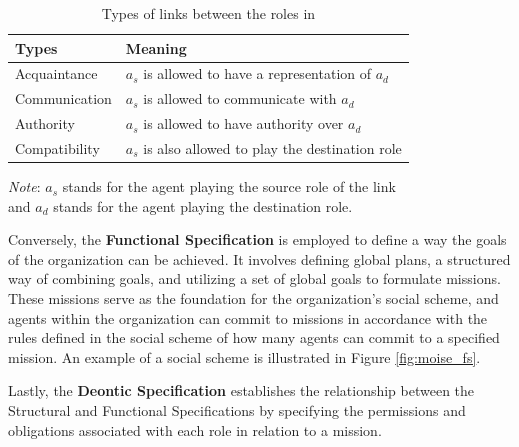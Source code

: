 \def \sourceagent{$a_s$ }
\def \destagent{$a_d$ }

\begin{table}[!htbp]
    \begin{minipage}{\columnwidth}
        \centering
        \begin{tabular}{l l}
            \toprule
            Types         & Meaning                                                        \\
            \midrule
            Acquaintance  & \sourceagent is allowed to have a representation of \destagent \\
            Communication & \sourceagent is allowed to communicate with \destagent         \\
            Authority     & \sourceagent is allowed to have authority over \destagent      \\
            Compatibility & \sourceagent is also allowed to play the destination role      \\
            \bottomrule
        \end{tabular}
        \begin{center}
            \footnotesize
            \emph{Note}: \sourceagent stands for the agent playing the source role of the link \\
            and \destagent stands for the agent playing the destination role. \\
        \end{center}
    \end{minipage}
    \caption{Types of links between the roles in \MOISEp}
    \label{tab:types_of_links_in_moise}
\end{table}

Conversely, the \textbf{Functional Specification} is employed to define a way the goals of the organization can be achieved. It involves defining global plans, a structured way of combining goals, and utilizing a set of global goals to formulate missions. These missions serve as the foundation for the organization's social scheme, and agents within the organization can commit to missions in accordance with the rules defined in the social scheme of how many agents can commit to a specified mission. An example of a social scheme is illustrated in Figure \ref{fig:moise_fs}.

Lastly, the \textbf{Deontic Specification} establishes the relationship between the Structural and Functional Specifications by specifying the permissions and obligations associated with each role in relation to a mission.

